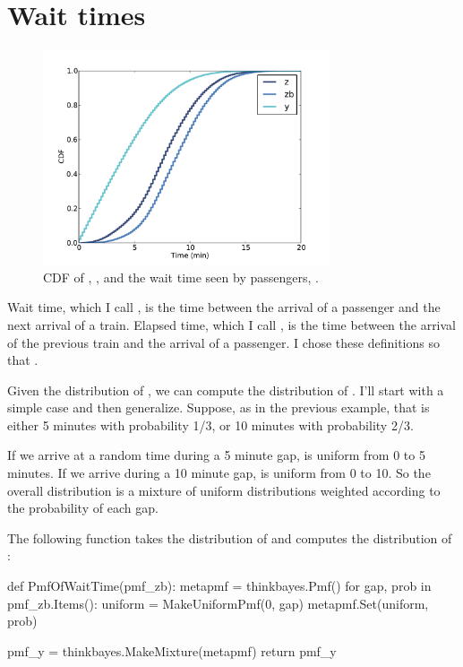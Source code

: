 \documentclass[12pt]{book}
\theoremstyle{exercise}
\begin{document}
\section{Wait times}

\begin{figure}
\centerline{\includegraphics[height=2.5in]{figs/redline2.pdf}}
\caption{CDF of , , and the wait time seen
by passengers, . }
\label{fig.redline2}
\end{figure}

Wait time, which I call , is the time between the arrival
of a passenger and the next arrival of a train.  Elapsed time, which I
call , is the time between the arrival of the previous
train and the arrival of a passenger.  I chose these definitions
so that .

Given the distribution of , we can compute the distribution of
.  I'll start with a simple case and then generalize.
Suppose, as in the previous example, that  is either 5 minutes
with probability 1/3, or 10 minutes with probability 2/3.

If we arrive at a random time during a 5 minute gap, 
 is uniform from 0 to 5 minutes.  If we arrive during a 10
minute gap,  is uniform from 0 to 10.  So the overall
distribution is a mixture of uniform distributions weighted
according to the probability of each gap.

The following function takes the distribution of  and
computes the distribution of :

\begin{code}
def PmfOfWaitTime(pmf_zb):
    metapmf = thinkbayes.Pmf()
    for gap, prob in pmf_zb.Items():
        uniform = MakeUniformPmf(0, gap)
        metapmf.Set(uniform, prob)

    pmf_y = thinkbayes.MakeMixture(metapmf)
    return pmf_y
\end{code}
\end{document}

